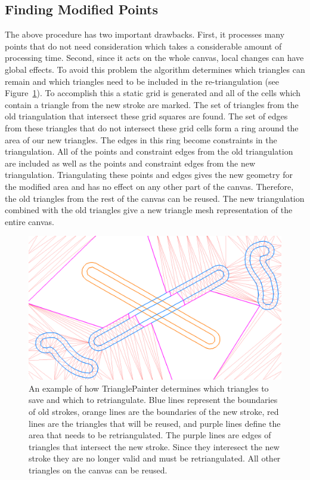 \documentclass[review]{acmsiggraph}
\begin{document}
\subsection{Finding Modified Points}
The above procedure has two important drawbacks. First, it processes many points that do not need
consideration which takes a considerable amount of processing time. Second, since it acts on the whole
canvas, local changes can have global effects. To avoid this problem the algorithm determines
which triangles can remain
and which triangles need to be included in the re-triangulation (see Figure~\ref{fig:modified}). To accomplish this a static grid
is generated and all of the cells which contain a triangle from the new stroke are marked. 
The set of triangles from the old triangulation that intersect these grid squares are found.
The set of edges from these triangles that do not intersect these grid cells form a ring
around the area of our new triangles. The edges in this ring become constraints
in the triangulation. All of the points and constraint edges from the old triangulation are
included as well as the points and constraint edges from the new triangulation. Triangulating
these points and edges gives the new geometry for the modified area and has no effect on any
other part of the canvas. Therefore, the old triangles from the rest of the canvas can be reused. 
The new triangulation combined with the old triangles give a new triangle mesh representation of the entire canvas.


\begin{figure}
    \centering
        \includegraphics[width=.5\textwidth]{images/grid}
    \caption{An example of how TrianglePainter determines which triangles to save and which to retriangulate. Blue
    lines represent the boundaries of old strokes, orange lines are the boundaries of the new stroke, red lines are
    the triangles that will be reused, and purple lines define the area that needs to be retriangulated. The purple
    lines are edges of triangles that intersect the new stroke. Since they interesect the new stroke they are no
    longer valid and must be retriangulated. All other triangles on the canvas can be reused.}
    \label{fig:modified}
\end{figure}
\end{document}

